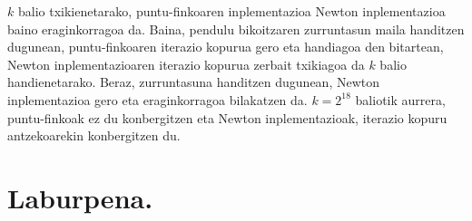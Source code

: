 $k$ balio txikienetarako, puntu-finkoaren inplementazioa Newton inplementazioa baino eraginkorragoa da. Baina, pendulu bikoitzaren zurruntasun maila handitzen dugunean, puntu-finkoaren iterazio kopurua gero eta handiagoa den bitartean, Newton inplementazioaren iterazio kopurua zerbait txikiagoa da $k$ balio handienetarako. Beraz, zurruntasuna handitzen dugunean, Newton inplementazioa gero eta eraginkorragoa bilakatzen da. $k=2^{18}$ baliotik aurrera, puntu-finkoak ez du konbergitzen eta Newton inplementazioak, iterazio kopuru antzekoarekin konbergitzen du.

 



\section{Laburpena.}


